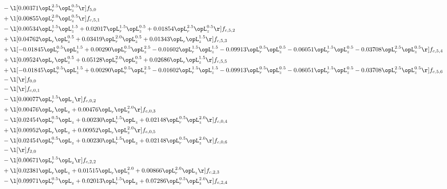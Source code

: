 \begin{alignat}{2}
& - \l[  0.00371 \opL_r^{2.5} \opL_z^{0.5}  \r] f_{5,0} \nonumber \\ 
& + \l[  0.00855 \opL_r^{2.0} \opL_z^{0.5}  \r] f_{c,5,1} \nonumber \\ 
& - \l[  0.00534 \opL_r^{1.5} \opL_z^{1.5} +  0.02017 \opL_r^{1.5} \opL_z^{0.5} +  0.01854 \opL_r^{2.5} \opL_z^{0.5}  \r] f_{c,5,2} \nonumber \\ 
& + \l[  0.04762 \opL_r \opL_z^{0.5} +  0.03419 \opL_r^{2.0} \opL_z^{0.5} +  0.01343 \opL_r \opL_z^{1.5}  \r] f_{c,5,3} \nonumber \\ 
& + \l[  -0.01845 \opL_r^{0.5} \opL_z^{1.5} +  0.00290 \opL_r^{0.5} \opL_z^{2.5}   -0.01602 \opL_r^{1.5} \opL_z^{1.5}   -0.09913 \opL_r^{0.5} \opL_z^{0.5}   -0.06051 \opL_r^{1.5} \opL_z^{0.5}   -0.03708 \opL_r^{2.5} \opL_z^{0.5}  \r] f_{c,5,4} \nonumber \\ 
& + \l[  0.09524 \opL_r \opL_z^{0.5} +  0.05128 \opL_r^{2.0} \opL_z^{0.5} +  0.02686 \opL_r \opL_z^{1.5}  \r] f_{c,5,5} \nonumber \\ 
& + \l[  -0.01845 \opL_r^{0.5} \opL_z^{1.5} +  0.00290 \opL_r^{0.5} \opL_z^{2.5}   -0.01602 \opL_r^{1.5} \opL_z^{1.5}   -0.09913 \opL_r^{0.5} \opL_z^{0.5}   -0.06051 \opL_r^{1.5} \opL_z^{0.5}   -0.03708 \opL_r^{2.5} \opL_z^{0.5}  \r] f_{c,5,6} \nonumber \\ 
& - \l[  \r] f_{0,0} \nonumber \\ 
& - \l[  \r] f_{c,0,1} \nonumber \\ 
& - \l[  0.00077 \opL_r^{1.5} \opL_z  \r] f_{c,0,2} \nonumber \\ 
& + \l[  0.00476 \opL_r \opL_z +  0.00476 \opL_r \opL_z^{2.0}  \r] f_{c,0,3} \nonumber \\ 
& - \l[  0.02454 \opL_r^{0.5} \opL_z +  0.00230 \opL_r^{1.5} \opL_z +  0.02148 \opL_r^{0.5} \opL_z^{2.0}  \r] f_{c,0,4} \nonumber \\ 
& + \l[  0.00952 \opL_r \opL_z +  0.00952 \opL_r \opL_z^{2.0}  \r] f_{c,0,5} \nonumber \\ 
& - \l[  0.02454 \opL_r^{0.5} \opL_z +  0.00230 \opL_r^{1.5} \opL_z +  0.02148 \opL_r^{0.5} \opL_z^{2.0}  \r] f_{c,0,6} \nonumber \\ 
& - \l[  \r] f_{2,0} \nonumber \\ 
& - \l[  0.00671 \opL_r^{1.5} \opL_z  \r] f_{c,2,2} \nonumber \\ 
& + \l[  0.02381 \opL_r \opL_z +  0.01515 \opL_r \opL_z^{2.0} +  0.00866 \opL_r^{2.0} \opL_z  \r] f_{c,2,3} \nonumber \\ 
& - \l[  0.09971 \opL_r^{0.5} \opL_z +  0.02013 \opL_r^{1.5} \opL_z +  0.07286 \opL_r^{0.5} \opL_z^{2.0}  \r] f_{c,2,4} \nonumber \\ 

\end{alignat}
